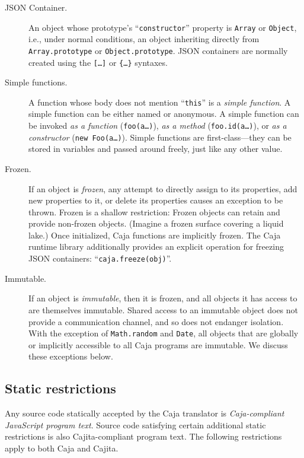 \documentclass[letterpaper,twocolumn,10pt]{article}
\newcommand{\code}[1]{{\tt {#1}}}              %
\begin{document}
\begin{description}

  \item[JSON Container.] An object whose prototype's ``\code{constructor}'' 
  property is \code{Array} or \code{Object}, i.e., under normal conditions, 
  an object inheriting directly from \code{Array.prototype} or 
  \code{Object.prototype}. JSON containers are normally created using the
  \code{[\ldots]} or \code{\{\ldots\}} syntaxes.

  \item[Simple functions.] A function whose body does not mention 
  ``\code{this}'' is a \emph{simple function}. A simple function can be 
  either named or anonymous. A simple function can be invoked \emph{as a 
  function} (\code{foo(a\ldots)}), \emph{as a method} 
  (\code{foo.id(a\ldots)}), or \emph{as a constructor} (\code{new 
  Foo(a\ldots)}). Simple functions are first-class---they can be stored in 
  variables and passed around freely, just like any other value.
  
  \item[Frozen.] If an object is \emph{frozen}, any attempt to directly 
  assign to its properties, add new properties to it, or delete its 
  properties causes an exception to be thrown. Frozen is a shallow 
  restriction: Frozen objects can retain and provide non-frozen objects. 
  (Imagine a frozen surface covering a liquid lake.) Once initialized, Caja 
  functions are implicitly frozen. The Caja runtime library additionally 
  provides an explicit operation for freezing JSON containers: 
  ``\code{caja.freeze(obj)}''.
  
  \item[Immutable.] If an object is \emph{immutable}, then it is frozen, and 
  all objects it has access to are themselves immutable. Shared access to an 
  immutable object does not provide a communication channel, and so does not 
  endanger isolation. With the exception of \code{Math.random} and 
  \code{Date}, all objects that are globally or implicitly accessible to all 
  Caja programs are immutable. We discuss these exceptions below.

\end{description}

\subsection{Static restrictions}

Any source code statically accepted by the Caja translator is 
\emph{Caja-compliant JavaScript program text}. Source code satisfying certain 
additional static restrictions is also Cajita-compliant program text. The 
following restrictions apply to both Caja and Cajita.
\end{document}
